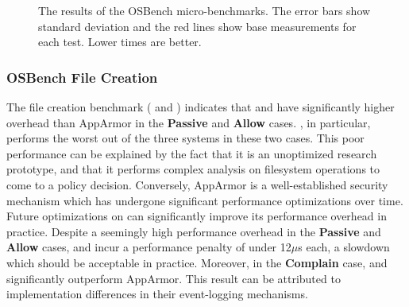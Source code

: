 \begin{figure}[htp]
{  }
  \caption[The results of the OSBench micro-benchmarks]{
    The results of the OSBench micro-benchmarks. The error bars show standard
    deviation and the red lines show base measurements for each test. Lower times are
    better.
  }%
  \label{fig:osbench}
\end{figure}

\subsubsection{OSBench File Creation}

The file creation benchmark ( and ) indicates
that \bpfbox{} and \bpfcontain{} have significantly higher overhead than AppArmor in the
\textbf{Passive} and \textbf{Allow} cases. \bpfcontain{}, in particular, performs the worst
out of the three systems in these two cases. This poor performance can be
explained by the fact that it is an unoptimized research prototype, and that it performs
complex analysis on filesystem operations to come to a policy decision. Conversely,
AppArmor is a well-established security mechanism which has undergone significant
performance optimizations over time. Future optimizations on \bpfcontain{} can
significantly improve its performance overhead in practice. Despite a seemingly high
performance overhead in the \textbf{Passive} and \textbf{Allow} cases, \bpfbox{} and
\bpfcontain{} incur a performance penalty of under 12$\mu$s each, a slowdown which should
be acceptable in practice.  Moreover, in the \textbf{Complain} case, \bpfbox{} and
\bpfcontain{} significantly outperform AppArmor. This result can be attributed to
implementation differences in their event-logging mechanisms.

